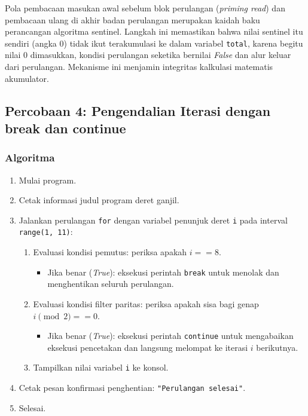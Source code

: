 \documentclass[12pt,a4paper]{article}
\begin{document}
Pola pembacaan masukan awal sebelum blok perulangan (\textit{priming read}) dan pembacaan ulang di akhir badan perulangan merupakan kaidah baku perancangan algoritma sentinel. Langkah ini memastikan bahwa nilai sentinel itu sendiri (angka 0) tidak ikut terakumulasi ke dalam variabel \texttt{total}, karena begitu nilai 0 dimasukkan, kondisi perulangan seketika bernilai \textit{False} dan alur keluar dari perulangan. Mekanisme ini menjamin integritas kalkulasi matematis akumulator.

\subsection{Percobaan 4: Pengendalian Iterasi dengan break dan continue}
\subsubsection{Algoritma}
\begin{enumerate}
    \item Mulai program.
    \item Cetak informasi judul program deret ganjil.
    \item Jalankan perulangan \texttt{for} dengan variabel penunjuk deret \texttt{i} pada interval \texttt{range(1, 11)}:
    \begin{enumerate}[label=\alph*.]
        \item Evaluasi kondisi pemutus: periksa apakah $i == 8$.
        \begin{itemize}
            \item Jika benar (\textit{True}): eksekusi perintah \texttt{break} untuk menolak dan menghentikan seluruh perulangan.
        \end{itemize}
        \item Evaluasi kondisi filter paritas: periksa apakah sisa bagi genap $i \pmod 2 == 0$.
        \begin{itemize}
            \item Jika benar (\textit{True}): eksekusi perintah \texttt{continue} untuk mengabaikan eksekusi pencetakan dan langsung melompat ke iterasi $i$ berikutnya.
        \end{itemize}
        \item Tampilkan nilai variabel \texttt{i} ke konsol.
    \end{enumerate}
    \item Cetak pesan konfirmasi penghentian: \texttt{"Perulangan selesai"}.
    \item Selesai.
\end{enumerate}
\end{document}
